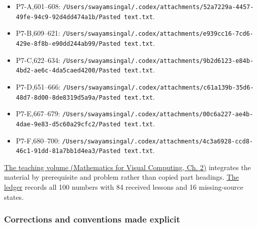 \begin{itemize}
\tightlist
\item
  P7-A,601--608: \texttt{/Users/swayamsingal/.codex/attachments/52a7229a-4457-49fe-94c9-92d4dd474a1b/Pasted\ text.txt}.
\item
  P7-B,609--621: \texttt{/Users/swayamsingal/.codex/attachments/e939cc16-7cd6-429e-8f8b-e90dd244ab99/Pasted\ text.txt}.
\item
  P7-C,622--634: \texttt{/Users/swayamsingal/.codex/attachments/9b2d6123-e84b-4bd2-ae6c-4da5caed4200/Pasted\ text.txt}.
\item
  P7-D,651--666: \texttt{/Users/swayamsingal/.codex/attachments/c61a139b-35d6-48d7-8d00-8de8319d5a9a/Pasted\ text.txt}.
\item
  P7-E,667--679: \texttt{/Users/swayamsingal/.codex/attachments/00c6a227-ae4b-4dae-9e83-d5c60a29cfc2/Pasted\ text.txt}.
\item
  P7-F,680--700: \texttt{/Users/swayamsingal/.codex/attachments/4c3a6928-ccd8-46c1-91dd-81a7bb1d4ea3/Pasted\ text.txt}.
\end{itemize}

\href{../02-Mathematics-for-Visual-Computing/main.pdf\#nameddest=01-foundations-i-ch018-keep-the-promises-visible-while-moving-between-representations}{The teaching volume (Mathematics for Visual Computing, Ch. 2)} integrates the material by prerequisite and problem rather than copied part headings. \hyperref[appendix-fd090d982a15-phase-7---parts-601-700]{The ledger} records all 100 numbers with 84 received lessons and 16 missing-source states.

\subsubsection{Corrections and conventions made explicit}\label{appendix-a103e7846d21-corrections-and-conventions-made-explicit}

